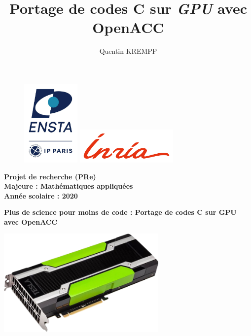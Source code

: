 \documentclass{article}
\title{Portage de codes C sur \textit{GPU} avec OpenACC}
\author{Quentin KREMPP}
\begin{document}
\begin{figure}[!htb]
  \includegraphics[height = 120pt]{Ensta.jpg}
	\endminipage\hspace*{4cm}
  \includegraphics[height = 50pt]{Inria.png}
	\endminipage
\end{figure}



    
        
    \begin{center}
        \Large
        \textbf{Projet de recherche (PRe)}\\
        \large
        \textbf{Majeure : Mathématiques appliquées}\\
        \textbf{Année scolaire : 2020}\\
        
    \bigbreak 
        
        \huge
        \textbf{Plus de science pour moins de code : Portage de codes C sur GPU avec OpenACC}\\
        
        
    \end{center}
        
    \begin{center}
        \includegraphics[height = 150pt]{GPU.png}
    \end{center}
    
\end{document}
